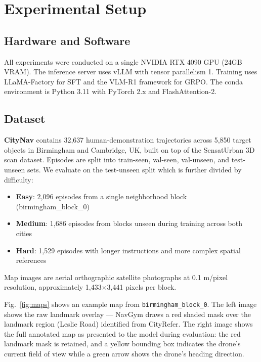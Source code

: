 \documentclass[conference]{IEEEtran}
\begin{document}
\section{Experimental Setup}

\subsection{Hardware and Software}
All experiments were conducted on a single NVIDIA RTX 4090 GPU (24GB VRAM). The inference server uses vLLM \cite{vllm} with tensor parallelism 1. Training uses LLaMA-Factory \cite{llamafactory} for SFT and the VLM-R1 \cite{vlmr1} framework for GRPO. The conda environment is Python 3.11 with PyTorch 2.x and FlashAttention-2.

\subsection{Dataset}
\textbf{CityNav} \cite{citynav} contains 32,637 human-demonstration trajectories across 5,850 target objects in Birmingham and Cambridge, UK, built on top of the SensatUrban 3D scan dataset. Episodes are split into train-seen, val-seen, val-unseen, and test-unseen sets. We evaluate on the test-unseen split which is further divided by difficulty:

\begin{itemize}
    \item \textbf{Easy}: 2,096 episodes from a single neighborhood block (birmingham\_block\_0)
    \item \textbf{Medium}: 1,686 episodes from blocks unseen during training across both cities
    \item \textbf{Hard}: 1,529 episodes with longer instructions and more complex spatial references
\end{itemize}

Map images are aerial orthographic satellite photographs at 0.1 m/pixel resolution, approximately 1,433$\times$3,441 pixels per block.

Fig.~\ref{fig:maps} shows an example map from \texttt{birmingham\_block\_0}. The left image shows the raw landmark overlay --- NavGym draws a red shaded mask over the landmark region (Leslie Road) identified from CityRefer. The right image shows the full annotated map as presented to the model during evaluation: the red landmark mask is retained, and a yellow bounding box indicates the drone's current field of view while a green arrow shows the drone's heading direction.
\end{document}
